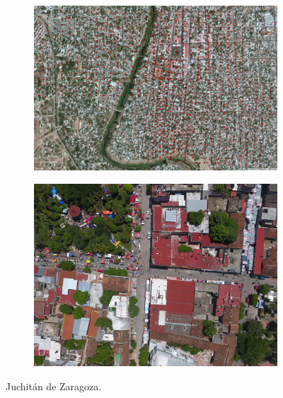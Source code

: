 \begin{figure}[!ht]
  \centering
    \begin{subfigure}{.8\textwidth}
        \includegraphics[width=\textwidth]{images/juchitan-satellite.jpg}
    \end{subfigure}
    \begin{subfigure}{.8\textwidth}
        \includegraphics[width=\textwidth]{images/juchitan-sample.jpg}
    \end{subfigure}
  \caption{Juchit\'an de Zaragoza.}
  \label{fig:juchitan}
\end{figure}

